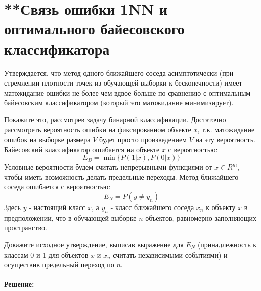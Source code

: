\documentclass[a4paper]{article}
\begin{document}
\section{**Связь ошибки 1NN и оптимального байесовского классификатора}

Утверждается, что метод одного ближайшего соседа асимптотически (при стремлении плотности точек из обучающей выборки к бесконечности) имеет матожидание ошибки не более чем вдвое больше по сравнению с оптимальным байесовским классификатором (который это матожидание минимизирует).

Покажите это, рассмотрев задачу бинарной классификации. Достаточно рассмотреть вероятность ошибки на фиксированном объекте $x$, т.к. матожидание ошибок на выборке размера $V$ будет просто произведением $V$ на эту вероятность. Байесовский классификатор ошибается на объекте $x$ с вероятностью:
$$
E_B = \min\{P(1|x), P(0|x)\}
$$
Условные вероятности будем считать непрерывными функциями от $x \in R^m$, чтобы иметь возможность делать предельные переходы. Метод ближайшего соседа ошибается с вероятностью:
$$
E_N = P(y \neq y_n)
$$
Здесь $y$ - настоящий класс $x$, а $y_n$ - класс ближайшего соседа $x_n$ к объекту $x$ в предположении, что в обучающей выборке $n$ объектов, равномерно заполняющих пространство. 

Докажите исходное утверждение, выписав выражение для $E_N$ (принадлежность к классам 0 и 1 для объектов $x$ и $x_n$ считать независимыми событиями) и осуществив предельный переход по $n$.
\\ \\
\textbf{Решение:}
\pagebreak
\end{document}
